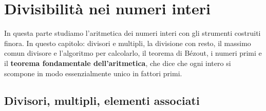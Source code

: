 \chapter{Divisibilità nei numeri interi}\label{cap:divisibilita}

In questa parte studiamo l'aritmetica dei numeri interi con gli strumenti costruiti finora. In questo capitolo: divisori e
multipli, la divisione con resto, il massimo comun divisore e l'algoritmo per calcolarlo, il teorema di Bézout, i numeri
primi e il \textbf{teorema fondamentale dell'aritmetica}, che dice che ogni intero si scompone in modo essenzialmente unico in
fattori primi.

\section{Divisori, multipli, elementi associati}\label{sec:divisori}



